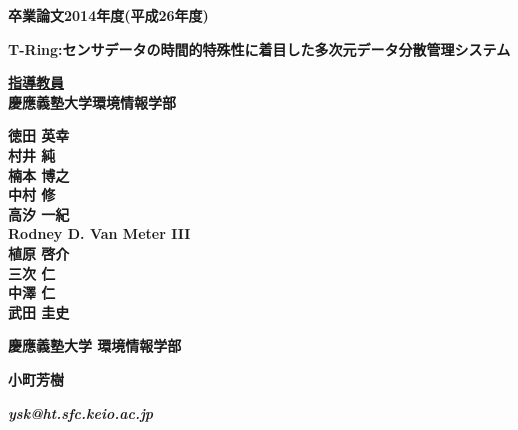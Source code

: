 \pagestyle{empty}

\begin{center}

\vspace{5cm}

\textbf{\Large 卒業論文2014年度(平成26年度)}

\vspace{1cm}

\textbf{\LARGE T-Ring:センサデータの時間的特殊性に着目した多次元データ分散管理システム}
\vspace{3cm}

\textbf{\underline{\large 指導教員}}\\
\textbf{慶應義塾大学環境情報学部}

\textbf{\Large 徳田 英幸}\\
\textbf{\Large 村井 純}\\
\textbf{\Large 楠本 博之}\\
\textbf{\Large 中村 修}\\
\textbf{\Large 高汐 一紀}\\
\textbf{\Large Rodney D. Van Meter III}\\
\textbf{\Large 植原 啓介}\\
\textbf{\Large 三次 仁}\\
\textbf{\Large 中澤 仁}\\
\textbf{\Large 武田 圭史}

\vspace{6cm}

\textbf{\LARGE 慶應義塾大学 環境情報学部}

\vspace{.5em}

\textbf{\LARGE 小町芳樹}

\vspace{.3em}

\textbf{\it ysk@ht.sfc.keio.ac.jp}



\newpage

\end{center}

\pagestyle{plain}
